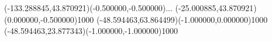 \kern -142.263780pt%
%
\color{ASYcolor}
\fontsize{12.000000}{14.400000}\selectfont
\usefont{\ASYencoding}{\ASYfamily}{\ASYseries}{\ASYshape}%
\ASYalign(-133.288845,43.870921)(-0.500000,-0.500000){...}%
\color{ASYcolor}
\fontsize{12.000000}{14.400000}\selectfont
\ASYalign(-25.000885,43.870921)(0.000000,-0.500000){1000}%
\color{ASYcolor}
\fontsize{12.000000}{14.400000}\selectfont
\ASYalign(-48.594463,63.864499)(-1.000000,0.000000){1000}%
\color{ASYcolor}
\fontsize{12.000000}{14.400000}\selectfont
\ASYalign(-48.594463,23.877343)(-1.000000,-1.000000){1000}%
